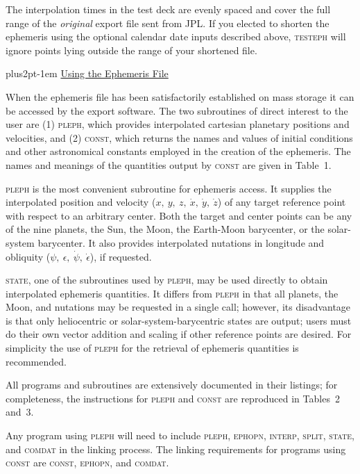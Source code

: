 \documentclass[twoside,11pt]{article}
\renewcommand{\_}{\texttt{\symbol{95}}}
\newcommand{\hdg}[1]{\vskip4pt plus2pt\leavevmode\kern-1em \underline{\large{#1}}\par}
\newcommand{\hdg}[1]{\subsection*{{#1}}}
\begin{document}
The interpolation times in the test deck are evenly spaced
and cover the full range of the {\it original\/} export file sent from JPL.
If you elected to shorten the ephemeris using the optional calendar
date inputs described above, \textsc{testeph}
will ignore points lying outside
the range of your shortened file.
 
\hdg{Using the Ephemeris File}

When the ephemeris file has been satisfactorily established
on mass storage it can be accessed by the export software.
The two subroutines of direct interest to the user are
(1) \textsc{pleph}, which provides interpolated
cartesian planetary positions and
velocities, and (2) \textsc{const}, which returns the
names and values of initial conditions and other astronomical
constants employed in the creation of the ephemeris. The
names and meanings of the quantities output by \textsc{const}
are given in Table~1.
 
\textsc{pleph} is the most convenient subroutine for ephemeris access.
It supplies the interpolated position and velocity ($x,\>y,\>z,
\>\dot x,\>\dot y,\>\dot z$)
of any target reference point with respect to an arbitrary center.
Both the target and center points can be any of the nine
planets, the Sun, the Moon, the Earth-Moon barycenter, or the
solar-system barycenter. It also provides interpolated nutations
in longitude and obliquity ($\psi,\>\epsilon,\>\dot\psi,
\>\dot\epsilon$), if requested.
 
\textsc{state}, one of the subroutines used by \textsc{pleph},
may be used directly to obtain interpolated ephemeris quantities.
It differs from \textsc{pleph} in that all planets, the Moon, and
nutations may be requested in a single call; however, its disadvantage
is that only heliocentric or solar-system-barycentric states are output;
users must do their own vector addition and scaling if other
reference points are desired. For simplicity the use of \textsc{pleph}
for the retrieval of ephemeris quantities is recommended.
 
All programs and subroutines are extensively documented in their
listings; for completeness, the instructions for \textsc{pleph}
and \textsc{const} are reproduced in Tables~2 and~3.
 
Any program using \textsc{pleph} will need to include
\textsc{pleph, ephopn, interp, split, state}, and \textsc{comdat}
in the linking process. The linking requirements for
programs using \textsc{const} are \textsc{const, ephopn}, and
\textsc{comdat}.
 
\end{document}
